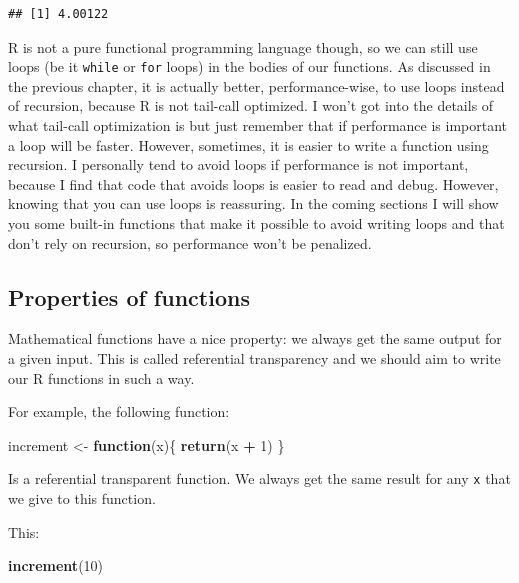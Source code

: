 \documentclass[]{gitbook}
\newenvironment{Shaded}{\begin{snugshade}}{\end{snugshade}}
\newcommand{\ControlFlowTok}[1]{\textcolor[rgb]{0.13,0.29,0.53}{\textbf{#1}}}
\newcommand{\DecValTok}[1]{\textcolor[rgb]{0.00,0.00,0.81}{#1}}
\newcommand{\KeywordTok}[1]{\textcolor[rgb]{0.13,0.29,0.53}{\textbf{#1}}}
\newcommand{\NormalTok}[1]{#1}
\newcommand{\OperatorTok}[1]{\textcolor[rgb]{0.81,0.36,0.00}{\textbf{#1}}}
\newcommand{\StringTok}[1]{\textcolor[rgb]{0.31,0.60,0.02}{#1}}
\begin{document}
\begin{verbatim}
## [1] 4.00122
\end{verbatim}

R is not a pure functional programming language though, so we can still use loops (be it \texttt{while} or
\texttt{for} loops) in the bodies of our functions. As discussed in the previous chapter, it is actually
better, performance-wise, to use loops instead of recursion, because R is not tail-call optimized.
I won't got into the details of what tail-call optimization is but just remember that if
performance is important a loop will be faster. However, sometimes, it is easier to write a
function using recursion. I personally tend to avoid loops if performance is not important,
because I find that code that avoids loops is easier to read and debug. However, knowing that
you can use loops is reassuring. In the coming sections I will show you some built-in functions
that make it possible to avoid writing loops and that don't rely on recursion, so performance
won't be penalized.

\hypertarget{properties-of-functions}{%
\subsection{Properties of functions}\label{properties-of-functions}}

Mathematical functions have a nice property: we always get the same output for a given input. This
is called referential transparency and we should aim to write our R functions in such a way.

For example, the following function:

\begin{Shaded}
\begin{Highlighting}[]
\NormalTok{increment <-}\StringTok{ }\ControlFlowTok{function}\NormalTok{(x)\{}
    \KeywordTok{return}\NormalTok{(x }\OperatorTok{+}\StringTok{ }\DecValTok{1}\NormalTok{)}
\NormalTok{\}}
\end{Highlighting}
\end{Shaded}

Is a referential transparent function. We always get the same result for any \texttt{x} that we give to
this function.

This:

\begin{Shaded}
\begin{Highlighting}[]
\KeywordTok{increment}\NormalTok{(}\DecValTok{10}\NormalTok{)}
\end{Highlighting}
\end{Shaded}
\end{document}
